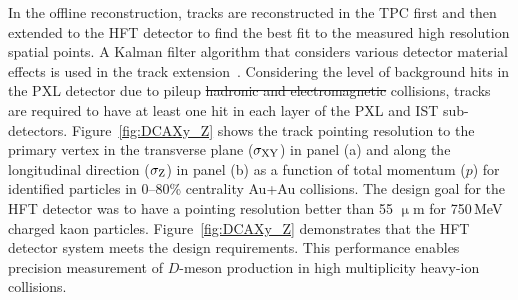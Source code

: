 \documentclass[%
 reprint,	
showpacs,
 amsmath,amssymb,
 aps,
 prc,
]{revtex4-1}
\providecommand{\DIFaddtex}[1]{{\protect\color{blue}\uwave{#1}}} %
\providecommand{\DIFdeltex}[1]{{\protect\color{red}\sout{#1}}}                      %
\providecommand{\DIFaddbegin}{} %
\providecommand{\DIFaddend}{} %
\providecommand{\DIFdelbegin}{} %
\providecommand{\DIFdelend}{} %
\providecommand{\DIFadd}[1]{\texorpdfstring{\DIFaddtex{#1}}{#1}} %
\providecommand{\DIFdel}[1]{\texorpdfstring{\DIFdeltex{#1}}{}} %
\begin{document}
\begin{table}[t]
\end{table}

In the offline reconstruction, tracks are reconstructed in the TPC first and then extended to the HFT detector to find the best fit to the measured high resolution spatial points. A Kalman filter algorithm that considers various detector material effects is used in the track extension~\cite{Kalman}. Considering the level of background hits in the PXL detector due to pileup \DIFdelbegin \DIFdel{hadronic and electromagnetic }\DIFdelend collisions, tracks are required to have at least one hit in each layer of the PXL and IST sub-detectors. Figure~\ref{fig:DCAXy_Z} shows the track pointing resolution to the primary vertex in the transverse plane ($\sigma_{\rm XY}$) in \DIFaddbegin \DIFadd{Fig.~\ref{fig:DCAXy_Z} }\DIFaddend panel (a) and along the longitudinal direction ($\sigma_{\rm Z}$) in \DIFaddbegin \DIFadd{Fig.~\ref{fig:DCAXy_Z} }\DIFaddend panel (b) as a function of total momentum ($p$) for identified particles in 0--80\% centrality Au+Au collisions. The design goal for the HFT detector was to have a pointing resolution better than 55 $\upmu$m for 750\,MeV charged kaon particles. Figure~\ref{fig:DCAXy_Z} demonstrates that the HFT detector system meets the design requirements. This performance enables precision measurement of $D$-meson production in high multiplicity heavy-ion collisions.
\end{document}
